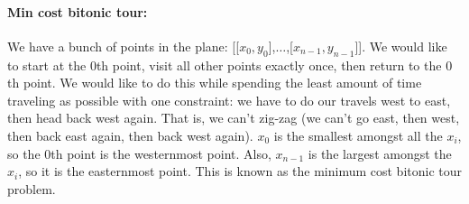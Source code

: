 \documentclass[11pt]{article}
\begin{document}

  






\paragraph{Min cost bitonic tour:}
We have a bunch of points in the plane:
[[$x_0,y_0$],$\ldots$,[$x_{n-1},y_{n-1}$]].  We would like to start at
the $0$th point, visit all other points exactly once, then return to
the $0$th point.  We would like to do this while spending the least
amount of time traveling as possible with one constraint: we have to
do our travels west to east, then head back west again.  That is, we
can't zig-zag (we can't go east, then west, then back east again, then
back west again).  $x_0$ is the smallest amongst all the $x_i$, so the
$0$th point is the westernmost point.  Also, $x_{n-1}$ is the largest
amongst the $x_i$, so it is the easternmost point.  This is known as
the minimum cost bitonic tour problem.
\end{document}
